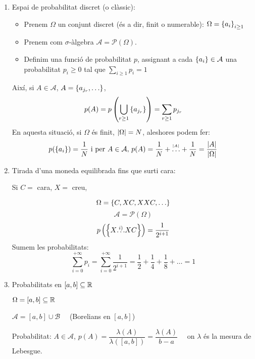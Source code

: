 \begin{example}\-
  \begin{enumerate}
      \item Espai de probabilitat discret (o clàssic):
      
      \begin{itemize}
          \item Prenem $\Omega$ un conjunt discret (és a dir, finit o numerable): $\Omega = \left\{a_i\right\}_{i\geq1}$
          \item Prenem com $\sigma$-àlgebra $\mathcal{A} = \mathcal{P}(\Omega)$.
          \item Definim una funció de probabilitat $p$, assignant a cada $\left\{a_i\right\}\in \mathcal{A}$ una 
          probabilitat $p_i \geq 0$ tal que $\sum\limits_{i\geq1}p_i = 1$
      \end{itemize}
      Així, si $A \in \mathcal{A}$, $A=\left\{a_{j_r}, \ldots\right\}$,
      \[
        p(A) = p\left(\bigcup_{r\geq1}\left\{a_{j_r}\right\}\right) = \sum_{r\geq1}p_{j_r}
      \]
      En aquesta situació, si $\Omega$ és finit, $\left\vert \Omega \right\vert = N$, aleshores podem fer:
      \[
        p(\left\{a_i\right\}) = \frac{1}{N} \text{ i per } A \in \mathcal{A}, \, p(A) = \frac{1}{N} + 
        \overset{^{\left\vert A \right\vert}}{\ldots} + \frac{1}{N} = \frac{\left\vert A \right\vert}{\left\vert \Omega \right\vert}
      \]
      
      \item Tirada d'una moneda equilibrada fins que surti cara:
      
      Si $C =$ cara, $X =$ creu,
      
      \[
        \Omega = \left\{C, XC, XXC, \ldots\right\}
      \]
      \[
        \mathcal{A} = \mathcal{P}(\Omega)
      \]
      \[
        p\left(\left\{X\overset{i)}{\ldots}XC\right\}\right) = \frac{1}{2^{i+1}}
      \]
      Sumem les probabilitats:
      \[
        \sum_{i=0}^{+\infty}p_i = \sum_{i=0}^{+\infty} \frac{1}{2^{i+1}} = \frac{1}{2} + \frac{1}{4} + 
        \frac{1}{8} + \ldots = 1
      \]
      
      \item Probabilitats en $[a,b] \subseteq \mathbb{R}$
      
      $\Omega = [a,b] \subseteq \mathbb{R}$
      
      $\mathcal{A} = [a,b] \cup \mathcal{B} \quad$ (Borelians en $[a,b]$) 
      
      Probabilitat: $A \in \mathcal{A}$, $p(A) = \dfrac{\lambda(A)}{\lambda([a,b])} = \dfrac{\lambda(A)}{b-a} 
      \quad$ on $\lambda$ és la mesura de Lebesgue.
  \end{enumerate}
\end{example}


